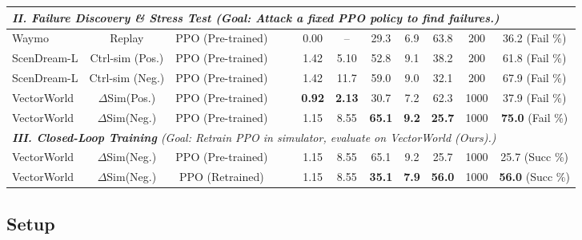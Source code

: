 \documentclass{article}
\newcommand{\cmark}{\textcolor{mydarkgray}{\ding{51}}}
\newcommand{\xmark}{\textcolor{mylightgray}{\ding{55}}}
\theoremstyle{plain}
\theoremstyle{definition}
\theoremstyle{remark}
\begin{document}
\begin{table}[t]
\begin{tabular}{@{} lcccc cc cccc c @{}}
    \midrule
    \multicolumn{12}{l}{\cellcolor{gray!10}\textit{\textbf{II. Failure Discovery \& Stress Test} (Goal: Attack a fixed PPO policy \cite{schulman2017proximal} to find failures.)}} \\
    \midrule
    
    Waymo & Replay & PPO (Pre-trained) & \xmark & \xmark & 0.00 & -- & 29.3 & 6.9 & 63.8 & 200 & 36.2 \scriptsize{(Fail \%)} \\
    ScenDream-L  & Ctrl-sim (Pos.) & PPO (Pre-trained) & \xmark & \xmark & 1.42 & 5.10 & 52.8 & 9.1 & 38.2 & 200 & 61.8 \scriptsize{(Fail \%)} \\
    ScenDream-L  & Ctrl-sim (Neg.) & PPO (Pre-trained) & \xmark & \xmark & 1.42 & 11.7 & 59.0 & 9.0 & 32.1 & 200 & 67.9 \scriptsize{(Fail \%)} \\
    VectorWorld & $\Delta$Sim(Pos.) & PPO (Pre-trained) & \cmark & \cmark & \textbf{0.92} & \textbf{2.13} & 30.7 & 7.2 & 62.3 & 1000 & 37.9 \scriptsize{(Fail \%)} \\
    \rowcolor{orange!10}
    VectorWorld & $\Delta$Sim(Neg.) & PPO (Pre-trained) & \cmark & \cmark & 1.15 & 8.55 & \textbf{65.1} & \textbf{9.2} & \textbf{25.7} & 1000 & \textbf{75.0} \scriptsize{(Fail \%)} \\

    \midrule
    \multicolumn{12}{l}{\cellcolor{gray!10}\textit{\textbf{III. Closed-Loop Training} (Goal: Retrain PPO in simulator, evaluate on VectorWorld (Ours).)}} \\
    \midrule
    
    VectorWorld & $\Delta$Sim(Neg.) & PPO (Pre-trained) & \cmark & \cmark & 1.15 & 8.55 & 65.1 & 9.2 & 25.7 & 1000 & 25.7 \scriptsize{(Succ \%)} \\
    \rowcolor{green!10}
    VectorWorld & $\Delta$Sim(Neg.) & PPO (Retrained) & \cmark & \cmark & 1.15 & 8.55 & \textbf{35.1} & \textbf{7.9} & \textbf{56.0} & 1000 & \textbf{56.0} \scriptsize{(Succ \%)} \\
    
    \bottomrule
  \end{tabular}
\end{table}


\subsection{Setup}
\label{sec:exp_setup}
\end{document}
